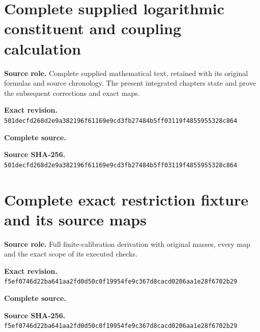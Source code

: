 \begingroup
\sloppy
\small
\clearpage
\section{Complete supplied logarithmic constituent and coupling calculation}
\noindent\textbf{Source role.} Complete supplied mathematical text, retained with its original formulas and source chronology. The present integrated chapters state and prove the subsequent corrections and exact maps.\par
\noindent\textbf{Exact revision.} \nolinkurl{501decfd268d2e9a382196f61169e9cd3fb27484b5ff03119f4855955328c864}\par
\noindent\textbf{Complete source.} \par
\noindent\textbf{Source SHA-256.} \nolinkurl{501decfd268d2e9a382196f61169e9cd3fb27484b5ff03119f4855955328c864}\par\medskip

\endgroup

\begingroup
\sloppy
\small
\clearpage
\section{Complete exact restriction fixture and its source maps}
\noindent\textbf{Source role.} Full finite-calibration derivation with original masses, every map and the exact scope of its executed checks.\par
\noindent\textbf{Exact revision.} \nolinkurl{f5ef0746d22ba641aa2fd0d50c0f19954fe9c367d8cacd0206aa1e28f6702b29}\par
\noindent\textbf{Complete source.} \par
\noindent\textbf{Source SHA-256.} \nolinkurl{f5ef0746d22ba641aa2fd0d50c0f19954fe9c367d8cacd0206aa1e28f6702b29}\par\medskip

\endgroup

\begingroup
\sloppy
\small
\makeatletter
\let\EndpointOriginalTagForm\tagform@
\def\tagform@#1{\EndpointOriginalTagForm{SGA\, #1}}
\makeatother
\clearpage
